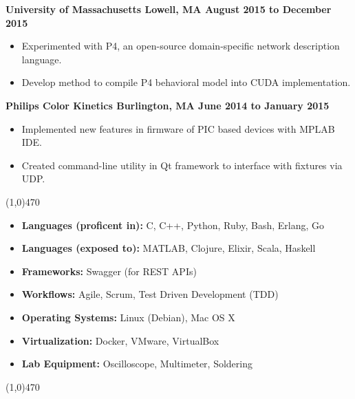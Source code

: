 \documentclass[11pt, a4paper]{article} %
\newcommand{\tinybullet}{ {\tiny \textbullet} }
\begin{document}
\centerline{\bf University of Massachusetts \tinybullet \hspace{1pt} Lowell, MA \hfill August 2015 to December 2015}
\begin{itemize}
\itemsep0em
	\item Experimented with P4, an open-source domain-specific network description language.
	\item Develop method to compile P4 behavioral model into CUDA implementation.
\end{itemize}

\centerline{\bf Philips Color Kinetics \tinybullet \hspace{1pt} Burlington, MA \hfill June 2014 to January 2015}
\begin{itemize}
\itemsep0em
	\item Implemented new features in firmware of PIC based devices with MPLAB IDE.
	\item Created command-line utility in Qt framework to interface with fixtures via UDP.
\end{itemize}

\noindent \line(1,0){470}\\

\vspace{5pt}
\begin{itemize}
\itemsep0em
	\item {\bf Languages (proficent in):} C, C++, Python, Ruby, Bash, Erlang, Go
	\item {\bf Languages (exposed to):} MATLAB, Clojure, Elixir, Scala, Haskell
	\item {\bf Frameworks:} Swagger (for REST APIs)
	\item {\bf Workflows:} Agile, Scrum, Test Driven Development (TDD)
	\item {\bf Operating Systems:} Linux (Debian), Mac OS X
	\item {\bf Virtualization:} Docker, VMware, VirtualBox
	\item {\bf Lab Equipment:} Oscilloscope, Multimeter, Soldering
\end{itemize}

\vfill
\noindent \line(1,0){470} \\
\end{document}
